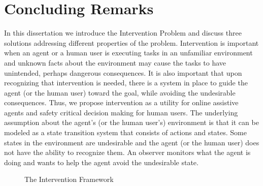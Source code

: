 \chapter{Concluding Remarks}
In this dissertation we introduce the Intervention Problem and discuss three solutions addressing different properties of the problem.
Intervention is important when an agent or a human user is executing tasks in an unfamiliar environment and unknown facts about the environment may cause the tasks to have unintended, perhaps dangerous consequences.
It is also important that upon recognizing that intervention is needed, there is a system in place to guide the agent (or the human user) toward the goal, while avoiding the undesirable consequences.
Thus, we propose intervention as a utility for online assistive agents and safety critical decision making for human users.
The underlying assumption about the agent's (or the human user's) environment is that it can be modeled as a state transition system that consists of actions and states.
Some states in the environment are undesirable and the agent (or the human user) does not have the ability to recognize them.
An observer monitors what the agent is doing and wants to help the agent avoid the undesirable state.

\begin{figure}[tpb]
   \caption{The Intervention Framework}
\label{fig:summary}
\end{figure}

